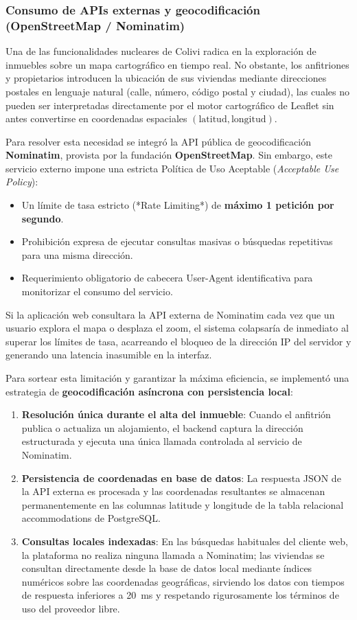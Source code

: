 \subsubsection{Consumo de APIs externas y geocodificación (OpenStreetMap / Nominatim)}

Una de las funcionalidades nucleares de Colivi radica en la exploración de inmuebles sobre un mapa cartográfico en tiempo real. No obstante, los anfitriones y propietarios introducen la ubicación de sus viviendas mediante direcciones postales en lenguaje natural (calle, número, código postal y ciudad), las cuales no pueden ser interpretadas directamente por el motor cartográfico de Leaflet sin antes convertirse en coordenadas espaciales $(\text{latitud}, \text{longitud})$.

Para resolver esta necesidad se integró la API pública de geocodificación \textbf{Nominatim}, provista por la fundación \textbf{OpenStreetMap}. Sin embargo, este servicio externo impone una estricta Política de Uso Aceptable (\emph{Acceptable Use Policy}):
\begin{itemize}
    \item Un límite de tasa estricto (*Rate Limiting*) de \textbf{máximo 1 petición por segundo}.
    \item Prohibición expresa de ejecutar consultas masivas o búsquedas repetitivas para una misma dirección.
    \item Requerimiento obligatorio de cabecera User-Agent identificativa para monitorizar el consumo del servicio.
\end{itemize}

Si la aplicación web consultara la API externa de Nominatim cada vez que un usuario explora el mapa o desplaza el zoom, el sistema colapsaría de inmediato al superar los límites de tasa, acarreando el bloqueo de la dirección IP del servidor y generando una latencia inasumible en la interfaz.

Para sortear esta limitación y garantizar la máxima eficiencia, se implementó una estrategia de \textbf{geocodificación asíncrona con persistencia local}:

\begin{enumerate}
    \item \textbf{Resolución única durante el alta del inmueble}: Cuando el anfitrión publica o actualiza un alojamiento, el backend captura la dirección estructurada y ejecuta una única llamada controlada al servicio de Nominatim.
    \item \textbf{Persistencia de coordenadas en base de datos}: La respuesta JSON de la API externa es procesada y las coordenadas resultantes se almacenan permanentemente en las columnas latitude y longitude de la tabla relacional accommodations de PostgreSQL.
    \item \textbf{Consultas locales indexadas}: En las búsquedas habituales del cliente web, la plataforma no realiza ninguna llamada a Nominatim; las viviendas se consultan directamente desde la base de datos local mediante índices numéricos sobre las coordenadas geográficas, sirviendo los datos con tiempos de respuesta inferiores a 20~ms y respetando rigurosamente los términos de uso del proveedor libre.
\end{enumerate}

